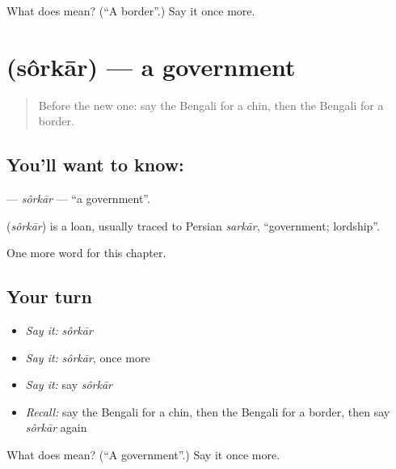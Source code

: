 \begin{tcolorbox}[breakable,colback=teal!4,colframe=teal!35!black,title={Before you move on}]
What does  mean? (\textquotedblleft{}A border\textquotedblright{}.) Say it once more.
\end{tcolorbox}
\section[\texorpdfstring{\bn{সরকার} (sôrkār)}{সরকার (sôrkār)}]{ (sôrkār) — a government}

\label{lesson:BN-C244-sorkar}



\begin{quote}
Before the new one: say the Bengali for a chin, then the Bengali for a border.
\end{quote}

\subsection*{You'll want to know: }
\textbf{} — \emph{sôrkār} — \textquotedblleft{}a government\textquotedblright{}.

\begin{cousinweb}
\textbf{} (\emph{sôrkār}) is a loan, usually traced to Persian \emph{sarkār}, \textquotedblleft{}government; lordship\textquotedblright{}.
\end{cousinweb}

\begin{grammarlens}[title={What you've built}]
One more word for this chapter.
\end{grammarlens}

\subsection*{Your turn}
\begin{itemize}
\raggedright
  \item \emph{Say it:} \emph{sôrkār}
  \item \emph{Say it:} \emph{sôrkār}, once more
  \item \emph{Say it:} say \emph{sôrkār}
  \item \emph{Recall:} say the Bengali for a chin, then the Bengali for a border, then say \emph{sôrkār} again
\end{itemize}

\begin{tcolorbox}[breakable,colback=teal!4,colframe=teal!35!black,title={Before you move on}]
What does  mean? (\textquotedblleft{}A government\textquotedblright{}.) Say it once more.
\end{tcolorbox}

